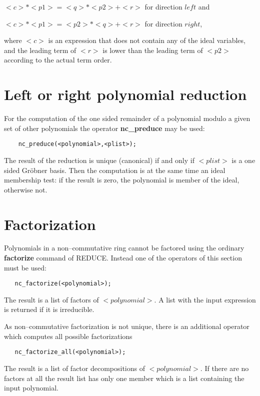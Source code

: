   $<c>*<p1>=<q>*<p2> + <r>$ for direction $left$ and

  $<c>*<p1>=<p2>*<q> + <r>$ for direction $right$,

where $<c>$ is an expression that does not contain any of the
ideal variables, and the leading term of $<r>$ is lower than
the leading term of $<p2>$ according to the actual term order.

\section{Left or right polynomial reduction}

For the computation of the one sided remainder of a polynomial
modulo a given set of other polynomials the operator
{\bf nc\_preduce} may be used:
\begin{verbatim}
    nc_preduce(<polynomial>,<plist>);
\end{verbatim}
The result of the reduction is unique (canonical) if
and only if $<plist>$ is a one sided Gr\"obner basis.
Then the computation is at the same time an ideal
membership test: if the result is zero, the
polynomial is member of the ideal, otherwise not.

\section{Factorization}

Polynomials in a non--commutative ring cannot be factored
using the ordinary {\bf factorize} command of {\small REDUCE}.
Instead one of the operators of this section must be used:
\begin{verbatim}
   nc_factorize(<polynomial>);
\end{verbatim}
The result is a list of factors of $<polynomial>$. A list
with the input expression is returned if it is irreducible.

As non--commutative factorization is not unique, there is
an additional operator which computes all possible factorizations
\begin{verbatim}
   nc_factorize_all(<polynomial>);
\end{verbatim}
The result is a list of factor decompositions of $<polynomial>$.
If there are no factors at all the result list has only one
member which is a list containing the input polynomial.

